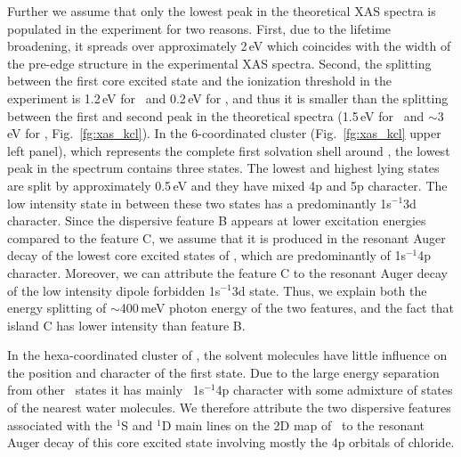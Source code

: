 Further we assume that only the lowest peak in the theoretical XAS spectra is populated in the experiment for two reasons. First, due to the lifetime broadening, it spreads over approximately 2\,eV which coincides with the width of the pre-edge structure in the experimental XAS spectra. Second, the splitting between the first core excited state and the ionization threshold in the experiment is 1.2\,eV for \ki~and 0.2\,eV for \cli, and thus it is smaller than the splitting between the first and second peak in the theoretical spectra (1.5\,eV for \ki~and $\sim$3\,eV for \cli, Fig.\ \ref{fg:xas_kcl}). In the 6-coordinated cluster (Fig.\ \ref{fg:xas_kcl} upper left panel), which represents the complete first solvation shell around \ki, the lowest peak in the spectrum contains three states. The lowest and highest lying states are split by approximately 0.5\,eV and they have mixed 4p and 5p character. The low intensity state in between these two states has a predominantly 1s$^{-1}$3d character. Since the dispersive feature B appears at lower excitation energies compared to the feature C, we assume that it is produced in the resonant Auger decay of the lowest core excited states of \ki, which are predominantly of 1s$^{-1}$4p character. Moreover, we can attribute the feature C to the resonant Auger decay of the low intensity dipole forbidden 1s$^{-1}$3d state. Thus, we explain both the energy splitting of $\sim$400\,meV photon energy of the two features, and the fact that island C has lower intensity than feature B.


In the hexa-coordinated cluster of \cli, the solvent molecules have little influence on the position and character of the first state. Due to the large energy separation from other \cli~states it has mainly \cli~1s$^{-1}$4p character with some admixture of states of the nearest water molecules. We therefore attribute the two dispersive features associated with the $^1$S and $^1$D main lines on the 2D map of \cli~to the resonant Auger decay of this core excited state involving mostly the 4p orbitals of chloride.


